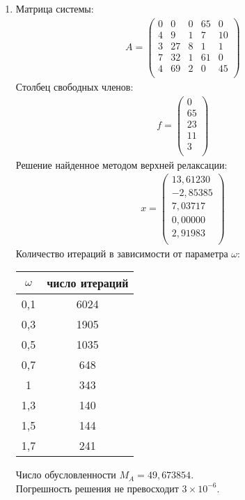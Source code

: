 \documentclass[a4paper,12pt,titlepage,finall]{article}
\begin{document}
\begin{enumerate}
\item
Матрица системы:
\begin{align*}
A = \begin{pmatrix}
0&     0&     0&    65&     0 \\
   4&     9&     1&     7&    10 \\
   3&    27&     8&     1&     1 \\
   7&    32&     1&    61&     0 \\
   4&    69&     2&     0&    45 \\
\end{pmatrix}
\end{align*}
Столбец свободных членов:
\begin{align*}
f = \begin{pmatrix}
   0 \\
  65 \\
  23 \\
  11 \\
   3 \\
\end{pmatrix}
\end{align*}
Решение найденное методом верхней релаксации:
\begin{align*}
x = \begin{pmatrix}
13,61230 \\
  -2,85385 \\
   7,03717 \\
   0,00000 \\
   2,91983 \\
\end{pmatrix}
\end{align*}
Количество итераций в зависимости от параметра $\omega$:
\begin{center}
\begin{tabular}{|c|c|}
\hline
$\omega$ & число итераций\\
\hline
0,1 & 6024\\
0,3 & 1905\\
0,5 & 1035\\
0,7 & 648\\
 1 & 343\\
 1,3 & 140\\
 1,5 & 144\\
 1,7 & 241\\
 \hline
\end{tabular}
\end{center}

Число обусловленности $M_A = 49,673854$.\\
Погрешность решения не превосходит $3 \times 10^{-6}$.


\end{enumerate}
\end{document}
